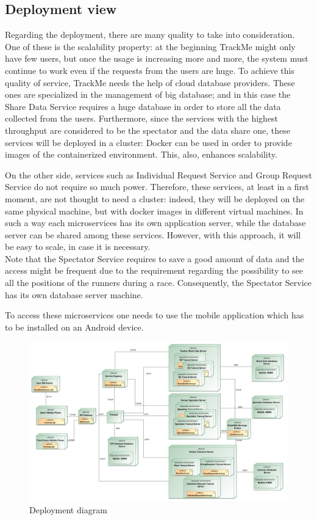\subsection{Deployment view}
\par
Regarding the deployment, there are many quality to take into consideration. One of these is the scalability property: at the beginning 
TrackMe might only have few users, but once the usage is increasing more and more, the system must continue to work even if the 
requests from the users are huge. To achieve this quality of service, TrackMe needs the help of cloud database providers. These ones 
are specialized in the management of big database; and in this case the Share Data Service requires a huge database in order to store 
all the data collected from the users. Furthermore, since the services with the highest throughput are considered to be the spectator and the
data share one, these services will be deployed in a cluster: Docker can be used in order to provide images of the containerized environment. 
This, also, enhances scalability. 
\par
On the other side, services such as Individual Request Service and Group Request Service do not require so much power. 
Therefore, these services, at least in a first moment, are not thought to need a cluster: indeed, they will be deployed on the same physical 
machine, but with docker images in different virtual machines. 
In such a way each microservices has its own application server, while the database server can be shared among these services. 
However, with this approach, it will be easy to scale, in case it is necessary. \\
Note that the Spectator Service requires to save a good amount of data and 
the access might be frequent due to the requirement regarding the possibility to see all the positions of the runners during a race. 
Consequently, the Spectator Service has its own database server machine.
\par
To access these microservices one needs to use the mobile application which has to be installed on an Android device.

\begin{figure}[H]
\includegraphics[width=\linewidth]{Images/deploymentdiagram.pdf}
\caption{ Deployment diagram }
\label{fig:deployment}
\end{figure}

